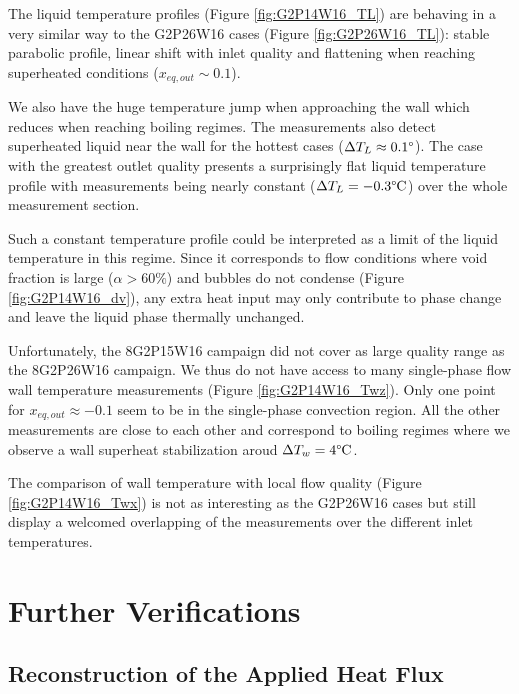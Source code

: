 \npar

The liquid temperature profiles (Figure \ref{fig:G2P14W16_TL}) are behaving in a very similar way to the G2P26W16 cases (Figure \ref{fig:G2P26W16_TL}): stable parabolic profile, linear shift with inlet quality and flattening when reaching superheated conditions ($x_{eq,out} \sim 0.1$).

We also have the huge temperature jump when approaching the wall which reduces when reaching boiling regimes. The measurements also detect superheated liquid near the wall for the hottest cases ($\Delta T_{L} \approx 0.1 \degree$). The case with the greatest outlet quality presents a surprisingly flat liquid temperature profile with measurements being nearly constant ($\Delta T_{L}=-0.3\degree\mathrm{C}$) over the whole measurement section. 

\begin{remark*}{}
Such a constant temperature profile could be interpreted as a limit of the liquid temperature in this regime. Since it corresponds to flow conditions where void fraction is large ($\alpha > 60\%$) and bubbles do not condense (Figure \ref{fig:G2P14W16_dv}), any extra heat input may only contribute to phase change and leave the liquid phase thermally unchanged.
\end{remark*}

\npar

Unfortunately, the 8G2P15W16 campaign did not cover as large quality range as the 8G2P26W16 campaign. We thus do not have access to many single-phase flow wall temperature measurements (Figure \ref{fig:G2P14W16_Twz}). Only one point for $x_{eq,out} \approx -0.1$ seem to be in the single-phase convection region. All the other measurements are close to each other and correspond to boiling regimes where we observe a wall superheat stabilization aroud $\Delta T_{w} = 4\degree\mathrm{C}$.

The comparison of wall temperature with local flow quality (Figure \ref{fig:G2P14W16_Twx}) is not as interesting as the G2P26W16 cases but still display a welcomed overlapping of the measurements over the different inlet temperatures.


\section{Further Verifications}


\subsection{Reconstruction of the Applied Heat Flux}


